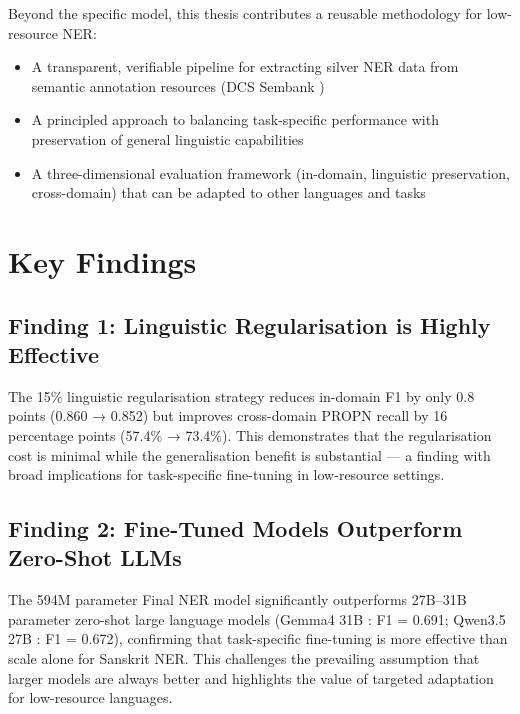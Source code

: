 Beyond the specific model, this thesis contributes a reusable methodology for low-resource NER:

\begin{itemize}
    \item A transparent, verifiable pipeline for extracting silver NER data from semantic annotation resources (DCS Sembank \cite{hellwig2010dcs})
    \item A principled approach to balancing task-specific performance with preservation of general linguistic capabilities
    \item A three-dimensional evaluation framework (in-domain, linguistic preservation, cross-domain) that can be adapted to other languages and tasks
\end{itemize}

\section{Key Findings}

\subsection{Finding 1: Linguistic Regularisation is Highly Effective}

The 15\% linguistic regularisation strategy reduces in-domain F1 by only 0.8 points (0.860 → 0.852) but improves cross-domain PROPN recall by 16 percentage points (57.4\% → 73.4\%). This demonstrates that the regularisation cost is minimal while the generalisation benefit is substantial — a finding with broad implications for task-specific fine-tuning in low-resource settings.

\subsection{Finding 2: Fine-Tuned Models Outperform Zero-Shot LLMs}

The 594M parameter Final NER model significantly outperforms 27B--31B parameter zero-shot large language models (Gemma4 31B \cite{google2025gemma4}: F1 = 0.691; Qwen3.5 27B \cite{qwen2025qwen35}: F1 = 0.672), confirming that task-specific fine-tuning is more effective than scale alone for Sanskrit NER. This challenges the prevailing assumption that larger models are always better and highlights the value of targeted adaptation for low-resource languages.

